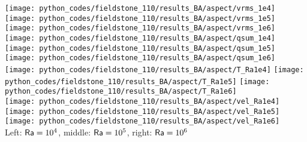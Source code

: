 \begin{center}
\texttt{[image: python\_codes/fieldstone\_110/results\_BA/aspect/vrms\_1e4]}
\texttt{[image: python\_codes/fieldstone\_110/results\_BA/aspect/vrms\_1e5]}
\texttt{[image: python\_codes/fieldstone\_110/results\_BA/aspect/vrms\_1e6]}\\
\texttt{[image: python\_codes/fieldstone\_110/results\_BA/aspect/qsum\_1e4]}
\texttt{[image: python\_codes/fieldstone\_110/results\_BA/aspect/qsum\_1e5]}
\texttt{[image: python\_codes/fieldstone\_110/results\_BA/aspect/qsum\_1e6]}\\
\texttt{[image: python\_codes/fieldstone\_110/results\_BA/aspect/T\_Ra1e4]}
\texttt{[image: python\_codes/fieldstone\_110/results\_BA/aspect/T\_Ra1e5]}
\texttt{[image: python\_codes/fieldstone\_110/results\_BA/aspect/T\_Ra1e6]}\\
\texttt{[image: python\_codes/fieldstone\_110/results\_BA/aspect/vel\_Ra1e4]}
\texttt{[image: python\_codes/fieldstone\_110/results\_BA/aspect/vel\_Ra1e5]}
\texttt{[image: python\_codes/fieldstone\_110/results\_BA/aspect/vel\_Ra1e6]}\\
{\captionfont Left: ${\mathsf{Ra}}=10^4$, middle: ${\mathsf{Ra}}=10^5$, right: ${\mathsf{Ra}}=10^6$} 
\end{center}

\vspace{5mm}

